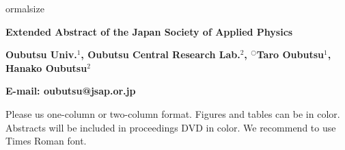 \documentclass[a4paper,11pt]{article}
\begin{document}
\renewcommand{\baselinestretch}{1.12}\small
ormalsize

\begin{center}
  \textbf{\Large Extended Abstract of the Japan Society of Applied Physics}
  
  \textbf{Oubutsu Univ.$^1$, Oubutsu Central Research Lab.$^2$, 
   $^\bigcirc$Taro Oubutsu$^1$, Hanako Oubutsu$^2$}
  
  \textbf{E-mail: oubutsu@jsap.or.jp}
\end{center}

Please us one-column or two-column format. Figures and tables can be in color. Abstracts will be included in proceedings DVD in color. We recommend to use Times Roman font.
\end{document}
